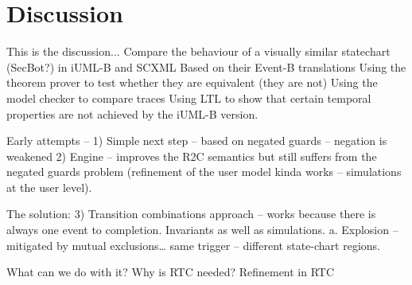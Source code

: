 
\section{Discussion}
\label{sec:discussion}

This is the discussion...
Compare the behaviour of a visually similar statechart (SecBot?) in iUML-B and SCXML 
	Based on their Event-B translations
	Using the theorem prover to test whether they are equivalent (they are not)
	Using the model checker to compare traces
	Using LTL to show that certain temporal properties are not achieved by the iUML-B version.


Early attempts – 
1)	Simple next step – based on negated guards – negation is weakened
2)	Engine – improves the R2C semantics but still suffers from the negated guards problem (refinement of the user model kinda works – simulations at the user level).

The solution:
3)	Transition combinations approach – works because there is always one event to completion. Invariants as well as simulations. 
a.	Explosion – mitigated by mutual exclusions… same trigger – different state-chart regions.

What can we do with it? 
	Why is RTC needed?
	Refinement in RTC
